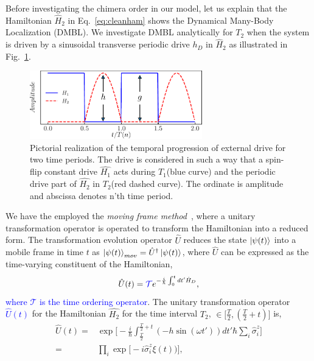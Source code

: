 \documentclass[%
reprint,
superscriptaddress,
amsmath,amssymb,showkeys,
aps,
prb,
]{revtex4-2}
\newcommand{\blue}[1]{\textcolor{blue}{#1}}
\begin{document}
	Before investigating the chimera order in our model, let us explain that the Hamiltonian $\hat{H}_2$ in Eq.~\eqref{eq:cleanham} shows the Dynamical Many-Body Localization (DMBL). We investigate DMBL analytically for $T_2$  when the system is driven by a sinusoidal transverse periodic drive $h_D$ in $\hat{H}_2$ as illustrated in Fig.~\ref{Fig:time_distribution}.
	\begin{figure}[t!]
		\begin{center}
			\includegraphics[width=7.5cm]{drive_distribution.pdf}
		\end{center}
		\caption[]{Pictorial realization of the temporal progression of external drive for two time periods. The drive is considered in such a way that a spin-flip constant drive $\hat{H_1}$ acts during $T_1$(blue curve) and the periodic drive part of $\hat{H_2}$ in $T_2$(red dashed curve). The ordinate is amplitude and abscissa denotes n'th time period.}
		\label{Fig:time_distribution}
	\end{figure}	
	We have the employed the \textit{moving frame method}~\cite{haldar_dynamical_2021}, where a unitary transformation operator is operated to transform the Hamiltonian into a reduced form. The transformation evolution operator $\hat{U}$ reduces the state $\ket{\psi(t)}$ into a mobile frame in time $t$ as $\ket{\psi(t)}_{mov} = \hat{U}^\dagger \ket{\psi(t)}$, where $\hat{U}$ can be expressed as the time-varying constituent of the Hamiltonian,
	\begin{equation}
		\hat{U}(t) = \blue{\mathcal{T}} e^{-\frac{i}{\hbar}\int_{0}^{t} dt' \hat{H}_D},
		\label{eq:rot1}
	\end{equation}
	\blue{where $\mathcal{T}$ is the time ordering operator}. The unitary transformation operator \blue{$\hat{U}(t)$} for the Hamiltonian $\hat{H_2}$ for the time interval $T_2$, $\in{\Big[\frac{T}{2}, (\frac{T}{2}+t) \Big]}$ is,
	\begin{align}
		\hat{U}(t) =& \exp \Bigg[-\frac{i}{\hbar}\int_{\frac{T}{2}}^{\frac{T}{2}+t} (-h \sin(\omega t'))dt'\hbar\sum_i\hat{\sigma}^z_i\Bigg]\nonumber\\
		=& \prod_{i} \exp\Big[-i \hat{\sigma}^z_i\xi(t))\Big],
	\end{align}	
\end{document}
